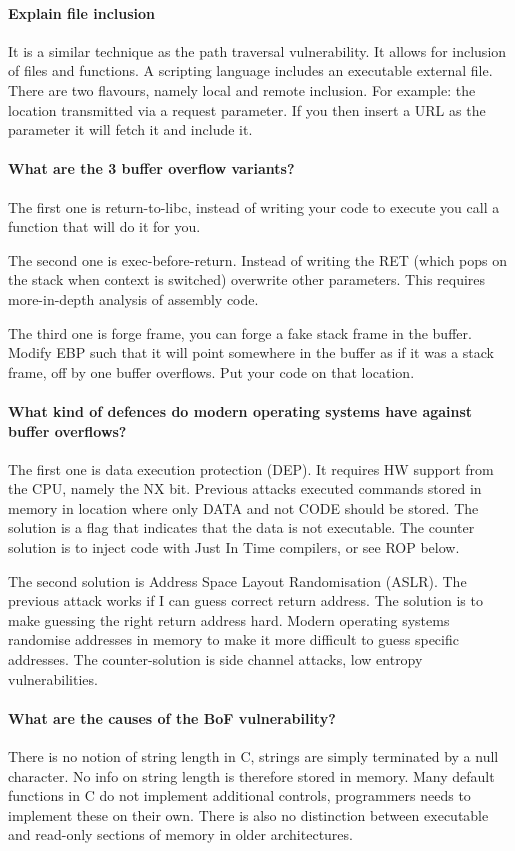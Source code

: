 \paragraph{Explain file inclusion}
It is a similar technique as the path traversal vulnerability. It allows for inclusion of files and functions. A scripting language includes an executable external file. There are two flavours, namely local and remote inclusion. For example: the location transmitted via a request parameter. If you then insert a URL as the parameter it will fetch it and include it.

\paragraph{What are the 3 buffer overflow variants?}
The first one is return-to-libc, instead of writing your code to execute you call a function that will do it for you. 

The second one is exec-before-return. Instead of writing the RET (which pops on the stack when context is switched) overwrite other parameters. This requires more-in-depth analysis of assembly code.

The third one is forge frame, you can forge a fake stack frame in the buffer. Modify EBP such that it will point somewhere in the buffer as if it was a stack frame, off by one buffer overflows. Put your code on that location.

\paragraph{What kind of defences do modern operating systems have against buffer overflows?}
The first one is data execution protection (DEP). It requires HW support from the CPU, namely the NX bit. Previous attacks executed commands stored in memory in location where only DATA and not CODE should be stored. The solution is a flag that indicates that the data is not executable. The counter solution is to inject code with Just In Time compilers, or see ROP below.

The second solution is Address Space Layout Randomisation (ASLR). The previous attack works if I can guess correct return address. The solution is to make guessing the right return address hard. Modern operating systems randomise addresses in memory to make it more difficult to guess specific addresses. The counter-solution is side channel attacks, low entropy vulnerabilities. 

\paragraph{What are the causes of the BoF vulnerability?}
There is no notion of string length in C, strings are simply terminated by a null character. No info on string length is therefore stored in memory. Many default functions in C do not implement additional controls, programmers needs to implement these on their own. There is also no distinction between executable and read-only sections of memory in older architectures.

 